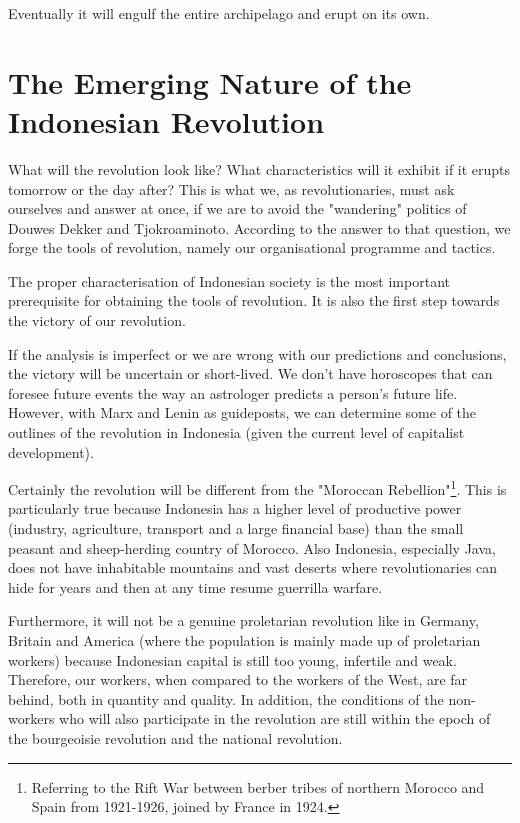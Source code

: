 Eventually it will engulf the entire archipelago and erupt on its own.\nline

\section{The Emerging Nature of the Indonesian Revolution}

What will the revolution look like? What characteristics will it exhibit if it erupts tomorrow or the day 
after? This is what we, as revolutionaries, must ask ourselves and answer at once, if we are to avoid the 
"wandering" politics of Douwes Dekker and Tjokroaminoto. According to the answer to that question, we forge 
the tools of revolution, namely our organisational programme and tactics.\nline

The proper characterisation of Indonesian society is the most important prerequisite for obtaining the tools of 
revolution. It is also the first step towards the victory of our revolution.\nline

If the analysis is imperfect or we are wrong with our predictions and conclusions, the victory will be 
uncertain or short-lived. We don't have horoscopes that can foresee future events the way an astrologer 
predicts a person's future life. However, with Marx and Lenin as guideposts, we can determine some of the 
outlines of the revolution in Indonesia (given the current level of capitalist development).\nline

Certainly the revolution will be different from the "Moroccan Rebellion"\footnote[10]{Referring to the Rift War between berber tribes of northern Morocco and Spain from 1921-1926, joined by France in 1924.}. This is particularly true because 
Indonesia has a higher level of productive power (industry, agriculture, transport and a large financial base) 
than the small peasant and sheep-herding country of Morocco. Also Indonesia, especially Java, does not have inhabitable 
mountains and vast deserts where revolutionaries can hide for years and then at any time resume guerrilla warfare.\nline

Furthermore, it will not be a genuine proletarian revolution like in Germany, Britain and America 
(where the population is mainly made up of proletarian workers) because Indonesian capital is still too young, infertile and weak. 
Therefore, our workers, when compared to the workers of the West, are far behind, both in quantity and quality. In addition, 
the conditions of the non-workers who will also participate in the revolution are still within the epoch of the bourgeoisie 
revolution and the national revolution.\nline

